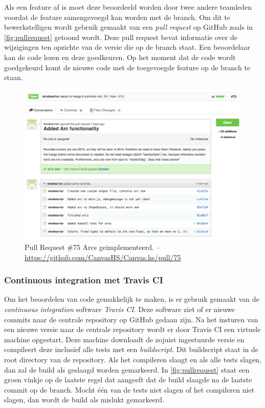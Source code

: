 Als een feature af is moet deze beoordeeld worden door twee andere teamleden voordat de feature samengevoegd kan worden met de  branch. Om dit te bewerkstelligen wordt gebruik gemaakt van een \emph{pull request} op GitHub zoals in \autoref{fig:pullrequest} getoond wordt. Deze pull request bevat informatie over de wijzigingen ten opzichte van de versie die op de  branch staat. Een beoordelaar kan de code lezen en deze goedkeuren. Op het moment dat de code wordt goedgekeurd komt de nieuwe code met de toegevoegde feature op de  branch te staan.

\begin{figure}
\begin{center}
\includegraphics[keepaspectratio,width=\textwidth]{./images/pullrequest.png}
\caption{Pull Request \#75 Arcs geimplementeerd. – \url{https://github.com/CanvasHS/Canvas.hs/pull/75}}
\label{fig:pullrequest}
\end{center}
\end{figure}

\subsubsection{Continuous integration met Travis CI}
Om het beoordelen van code gemakkelijk te maken, is er gebruik gemaakt van de \emph{continuous integration} software \emph{Travis CI}. Deze software ziet of er nieuwe commits naar de centrale repository op GitHub gedaan zijn. Na het insturen van een nieuwe versie naar de centrale repository wordt er door Travis CI een virtuele machine opgestart. Deze machine downloadt de zojuist ingestuurde versie en compileert deze inclusief alle tests met een \emph{buildscript}. Dit buildscript staat in de root directory van de repository. Als het compileren slaagt en als alle tests slagen, dan zal de build als geslaagd worden gemarkeerd. In \autoref{fig:pullrequest} staat een groen vinkje op de laatste regel dat aangeeft dat de build slaagde na de laatste commit op de  branch. Mocht één van de tests niet slagen of het compileren niet slagen, dan wordt de build als mislukt gemarkeerd.

